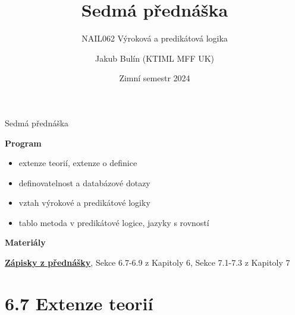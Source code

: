 \documentclass{beamer}
\title{Sedmá přednáška}
\subtitle{NAIL062 Výroková a predikátová logika}
\author{Jakub Bulín (KTIML MFF UK)}
\date{Zimní semestr 2024}
\begin{document}
\maketitle


\begin{frame}{Sedmá přednáška}

    \textbf{Program}
        \begin{itemize}
            \item extenze teorií, extenze o definice
            \item definovatelnost a databázové dotazy
            \item vztah výrokové a predikátové logiky
            \item tablo metoda v predikátové logice, jazyky s rovností
        \end{itemize}

    \textbf{Materiály}

        \href{https://github.com/jbulin-mff-uk/nail062/raw/main/lecture/lecture-notes/lecture-notes.pdf}{\alert{\textbf{Zápisky z přednášky}}}, Sekce 6.7-6.9 z Kapitoly 6, Sekce 7.1-7.3 z Kapitoly 7

\end{frame}


\section{6.7 Extenze teorií}
\end{document}
